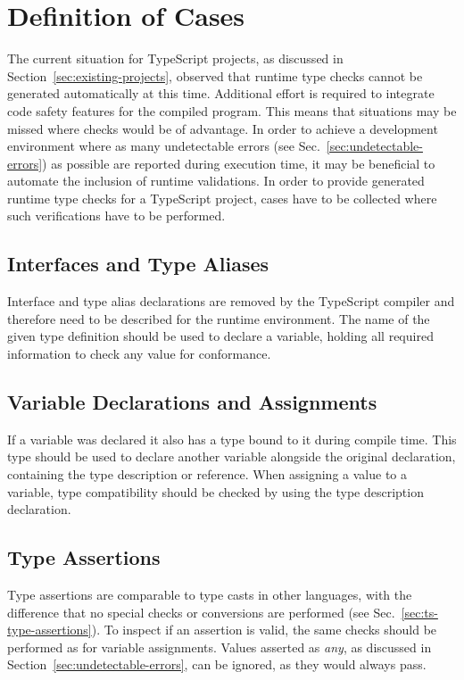 \section{Definition of Cases}
\label{sec:type-check-situations}

The current situation for TypeScript projects, as discussed in Section~\ref{sec:existing-projects}, observed that runtime type checks cannot be generated automatically at this time. Additional effort is required to integrate code safety features for the compiled program. This means that situations may be missed where checks would be of advantage. In order to achieve a development environment where as many undetectable errors (see Sec.~\ref{sec:undetectable-errors}) as possible are reported during execution time, it may be beneficial to automate the inclusion of runtime validations. In order to provide generated runtime type checks for a TypeScript project, cases have to be collected where such verifications have to be performed.

\subsection{Interfaces and Type Aliases}

Interface and type alias declarations are removed by the TypeScript compiler and therefore need to be described for the runtime environment. The name of the given type definition should be used to declare a variable, holding all required information to check any value for conformance.

\subsection{Variable Declarations and Assignments}

If a variable was declared it also has a type bound to it during compile time. This type should be used to declare another variable alongside the original declaration, containing the type description or reference. When assigning a value to a variable, type compatibility should be checked by using the type description declaration.

\subsection{Type Assertions}

Type assertions are comparable to type casts in other languages, with the difference that no special checks or conversions are performed (see Sec.~\ref{sec:ts-type-assertions}). To inspect if an assertion is valid, the same checks should be performed as for variable assignments. Values asserted as \emph{any}, as discussed in Section~\ref{sec:undetectable-errors}, can be ignored, as they would always pass.

